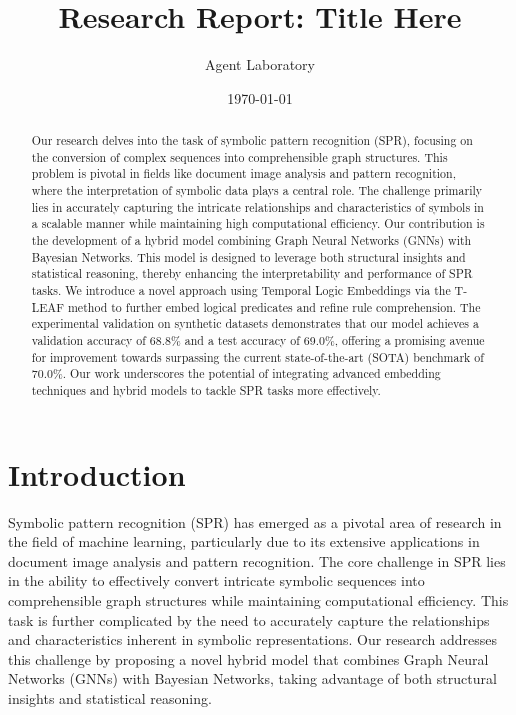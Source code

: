\documentclass{article}
\title{Research Report: Title Here}
\author{Agent Laboratory}
\date{\today}
\begin{document}
\maketitle

\begin{abstract}
Our research delves into the task of symbolic pattern recognition (SPR), focusing on the conversion of complex sequences into comprehensible graph structures. This problem is pivotal in fields like document image analysis and pattern recognition, where the interpretation of symbolic data plays a central role. The challenge primarily lies in accurately capturing the intricate relationships and characteristics of symbols in a scalable manner while maintaining high computational efficiency. Our contribution is the development of a hybrid model combining Graph Neural Networks (GNNs) with Bayesian Networks. This model is designed to leverage both structural insights and statistical reasoning, thereby enhancing the interpretability and performance of SPR tasks. We introduce a novel approach using Temporal Logic Embeddings via the T-LEAF method to further embed logical predicates and refine rule comprehension. The experimental validation on synthetic datasets demonstrates that our model achieves a validation accuracy of 68.8\% and a test accuracy of 69.0\%, offering a promising avenue for improvement towards surpassing the current state-of-the-art (SOTA) benchmark of 70.0\%. Our work underscores the potential of integrating advanced embedding techniques and hybrid models to tackle SPR tasks more effectively.
\end{abstract}

\section{Introduction}
Symbolic pattern recognition (SPR) has emerged as a pivotal area of research in the field of machine learning, particularly due to its extensive applications in document image analysis and pattern recognition. The core challenge in SPR lies in the ability to effectively convert intricate symbolic sequences into comprehensible graph structures while maintaining computational efficiency. This task is further complicated by the need to accurately capture the relationships and characteristics inherent in symbolic representations. Our research addresses this challenge by proposing a novel hybrid model that combines Graph Neural Networks (GNNs) with Bayesian Networks, taking advantage of both structural insights and statistical reasoning. 
\end{document}
